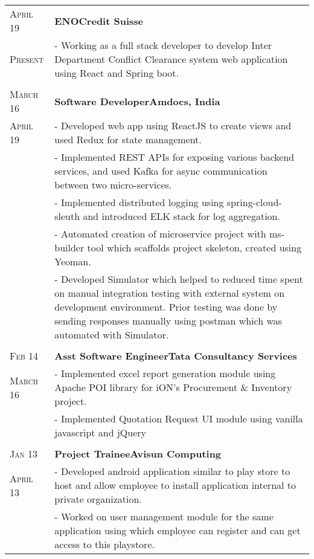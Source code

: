 \documentclass[a4paper,10pt]{extarticle} %
\begin{document}
\begin{tabularx}{\linewidth}{ l | X }

\textsc{April 19} & \textbf{ENO}\hfill\textbf{Credit Suisse}\\
\textsc{Present}& {- Working as a full stack developer to develop Inter Department Conflict Clearance system web application using React and Spring boot.}\\

\multicolumn{2}{c}{} \\

\textsc{March 16} & \textbf{Software Developer}\hfill\textbf{Amdocs, India}\\
\textsc{April 19}& {- Developed web app using ReactJS to create views and used Redux for state management.}\\
& {- Implemented REST APIs for exposing various backend services, and used Kafka for async communication between two micro-services.}\\
& {- Implemented distributed logging using spring-cloud-sleuth and introduced ELK stack for log aggregation.}\\
& {- Automated creation of microservice project with ms-builder tool which scaffolds project skeleton, created using Yeoman.}\\
& {- Developed Simulator which helped to reduced time spent on manual integration testing with external system on development environment. Prior testing was done by sending responses manually using postman which was automated with Simulator.}\\

\multicolumn{2}{c}{} \\

\textsc{Feb 14} & \textbf{Asst Software Engineer}\hfill\textbf{Tata Consultancy Services}\\
\textsc{March 16}& {- Implemented excel report generation module using Apache POI library for iON's Procurement \& Inventory project.}\\
& {- Implemented Quotation Request UI module using vanilla javascript and jQuery}\\
\multicolumn{2}{c}{} \\

\textsc{Jan 13} & \textbf{Project Trainee}\hfill\textbf{Avisun Computing}\\
\textsc{April 13} & {- Developed android application similar to play store to host and allow employee to install application internal to private organization.}\\
& {- Worked on user management module for the same application using which employee can register and can get access to this playstore.}

\end{tabularx}
\end{document}
